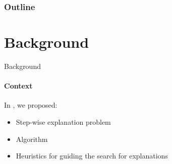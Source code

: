\documentclass{beamer}
\begin{document}
	\begin{frame}
		\frametitle{Outline}
		\tableofcontents
	\end{frame}

	\section{Background}
	\begin{frame}{Background}
	\framesubtitle{Context}
	In \cite{bogaerts2020step}, we proposed:\pause

		\begin{itemize}
			\item Step-wise explanation problem
			\item Algorithm 
			\item Heuristics for guiding the search for explanations
		\end{itemize}
		\end{frame}
\end{document}
